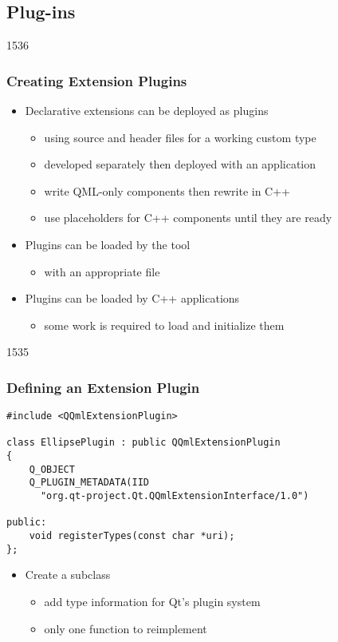 \subsection{Plug-ins}\label{QtQuickPlugins}

\begin{slide}{1536}\frametitle{Creating Extension Plugins}

\begin{itemize}
\item Declarative extensions can be deployed as plugins 
  \begin{itemize}
  \item using source and header files for a working custom type
  \item developed separately then deployed with an application
  \item write QML-only components then rewrite in C++
  \item use placeholders for C++ components until they are ready
  \end{itemize}
\vspace*{0.5em}
\item Plugins can be loaded by the  tool
  \begin{itemize}
  \item with an appropriate  file
  \end{itemize}
\vspace*{0.5em}
\item Plugins can be loaded by C++ applications
  \begin{itemize}
  \item some work is required to load and initialize them
  \end{itemize}
\end{itemize}

\end{slide}

\begin{slide}[fragile]{1535}\frametitle{Defining an Extension Plugin}

\begin{lstlisting}
#include <QQmlExtensionPlugin>

class EllipsePlugin : public QQmlExtensionPlugin
{
    Q_OBJECT
    Q_PLUGIN_METADATA(IID
      "org.qt-project.Qt.QQmlExtensionInterface/1.0")

public:
    void registerTypes(const char *uri);
};
\end{lstlisting}

\vspace*{0.5em}
\begin{itemize}
\item Create a  subclass
  \begin{itemize}
  \item add type information for Qt's plugin system
  \item only one function to reimplement
  \end{itemize}
\end{itemize}

\end{slide}

